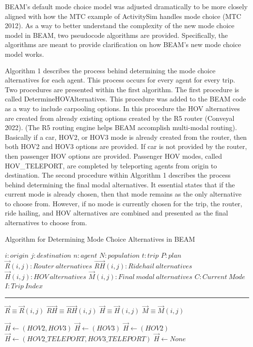 \documentclass[12pt, oneside, openright]{byuthesis}
\begin{document}
BEAM's default mode choice model was adjusted dramatically to be more closely aligned with how the MTC example of ActivitySim handles mode choice (MTC 2012). As a way to better understand the complexity of the new mode choice model in BEAM, two pseudocode algorithms are provided. Specifically, the algorithms are meant to provide clarification on how BEAM's new mode choice model works.

Algorithm 1 describes the process behind determining the mode choice alternatives for each agent. This process occurs for every agent for every trip. Two procedures are presented within the first algorithm. The first procedure is called DetermineHOVAlternatives. This procedure was added to the BEAM code as a way to include carpooling options. In this procedure the HOV alternatives are created from already existing options created by the R5 router (Conveyal 2022). (The R5 routing engine helps BEAM accomplish multi-modal routing). Basically if a car, HOV2, or HOV3 mode is already created from the router, then both HOV2 and HOV3 options are provided. If car is not provided by the router, then passenger HOV options are provided. Passenger HOV modes, called HOV\_TELEPORT, are completed by teleporting agents from origin to destination. The second procedure within Algorithm 1 describes the process behind determining the final modal alternatives. It essential states that if the current mode is already chosen, then that mode remains as the only alternative to choose from. However, if no mode is currently chosen for the trip, the router, ride hailing, and HOV alternatives are combined and presented as the final alternatives to choose from.

\begin{algorithm} [tph]
\caption{Algorithm for Determining Mode Choice Alternatives in BEAM}
\begin{algorithmic}[1]
\Require
\State $i : origin$
\State $j : destination$
\State $n: agent$
\State $N: population$
\State $t : trip $
\State $P : plan$
\State $\vec{R}(i,j) : Router\: alternatives$
\State $\vec{RH}(i,j) : Ridehail\:alternatives$
\State $\vec{H}(i,j) : HOV\:alternatives$
\State $\vec{M}(i,j) : Final\:modal\:alternatives$
\State $C : Current\:Mode$
\State $I : Trip\:Index$
\vspace{4pt}\hrule\vspace{5pt}

\State $\vec{R} \equiv \vec{R}(i,j)$
\State $\vec{RH} \equiv \vec{RH}(i,j)$
\State $\vec{H} \equiv \vec{H}(i,j)$
\State $\vec{M} \equiv \vec{M}(i,j)$

    \State $\vec{H} \gets (HOV2,HOV3)$
    \State $\vec{H} \gets (HOV3)$
    \State $\vec{H} \gets (HOV2)$
    \State $\vec{H} \gets (HOV2\_TELEPORT, HOV3\_TELEPORT)$
  \EndIf
\Else
  \State $\vec{H} \gets None$
\EndIf
\EndProcedure
\Statex
{}
\end{algorithmic}
\end{algorithm}
\end{document}
